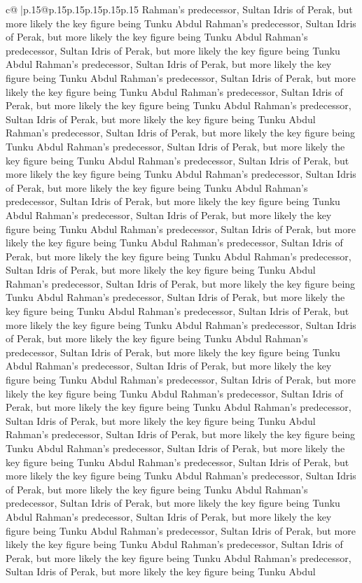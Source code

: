 \documentclass{article}
\begin{document}
{\begin{supertabular}{c@{$\;$}|p{.15\linewidth}@{}p{.15\linewidth}p{.15\linewidth}p{.15\linewidth}p{.15\linewidth}p{.15\linewidth}}
{{{Rahman's predecessor, Sultan Idris of Perak, but more likely the key figure being Tunku Abdul Rahman's predecessor, Sultan Idris of Perak, but more likely the key figure being Tunku Abdul Rahman's predecessor, Sultan Idris of Perak, but more likely the key figure being Tunku Abdul Rahman's predecessor, Sultan Idris of Perak, but more likely the key figure being Tunku Abdul Rahman's predecessor, Sultan Idris of Perak, but more likely the key figure being Tunku Abdul Rahman's predecessor, Sultan Idris of Perak, but more likely the key figure being Tunku Abdul Rahman's predecessor, Sultan Idris of Perak, but more likely the key figure being Tunku Abdul Rahman's predecessor, Sultan Idris of Perak, but more likely the key figure being Tunku Abdul Rahman's predecessor, Sultan Idris of Perak, but more likely the key figure being Tunku Abdul Rahman's predecessor, Sultan Idris of Perak, but more likely the key figure being Tunku Abdul Rahman's predecessor, Sultan Idris of Perak, but more likely the key figure being Tunku Abdul Rahman's predecessor, Sultan Idris of Perak, but more likely the key figure being Tunku Abdul Rahman's predecessor, Sultan Idris of Perak, but more likely the key figure being Tunku Abdul Rahman's predecessor, Sultan Idris of Perak, but more likely the key figure being Tunku Abdul Rahman's predecessor, Sultan Idris of Perak, but more likely the key figure being Tunku Abdul Rahman's predecessor, Sultan Idris of Perak, but more likely the key figure being Tunku Abdul Rahman's predecessor, Sultan Idris of Perak, but more likely the key figure being Tunku Abdul Rahman's predecessor, Sultan Idris of Perak, but more likely the key figure being Tunku Abdul Rahman's predecessor, Sultan Idris of Perak, but more likely the key figure being Tunku Abdul Rahman's predecessor, Sultan Idris of Perak, but more likely the key figure being Tunku Abdul Rahman's predecessor, Sultan Idris of Perak, but more likely the key figure being Tunku Abdul Rahman's predecessor, Sultan Idris of Perak, but more likely the key figure being Tunku Abdul Rahman's predecessor, Sultan Idris of Perak, but more likely the key figure being Tunku Abdul Rahman's predecessor, Sultan Idris of Perak, but more likely the key figure being Tunku Abdul Rahman's predecessor, Sultan Idris of Perak, but more likely the key figure being Tunku Abdul Rahman's predecessor, Sultan Idris of Perak, but more likely the key figure being Tunku Abdul Rahman's predecessor, Sultan Idris of Perak, but more likely the key figure being Tunku Abdul Rahman's predecessor, Sultan Idris of Perak, but more likely the key figure being Tunku Abdul Rahman's predecessor, Sultan Idris of Perak, but more likely the key figure being Tunku Abdul Rahman's predecessor, Sultan Idris of Perak, but more likely the key figure being Tunku Abdul Rahman's predecessor, Sultan Idris of Perak, but more likely the key figure being Tunku Abdul Rahman's predecessor, Sultan Idris of Perak, but more likely the key figure being Tunku Abdul Rahman's predecessor, Sultan Idris of Perak, but more likely the key figure being Tunku Abdul Rahman's predecessor, Sultan Idris of Perak, but more likely the key figure being Tunku Abdul }}}
\end{supertabular}}
\end{document}
